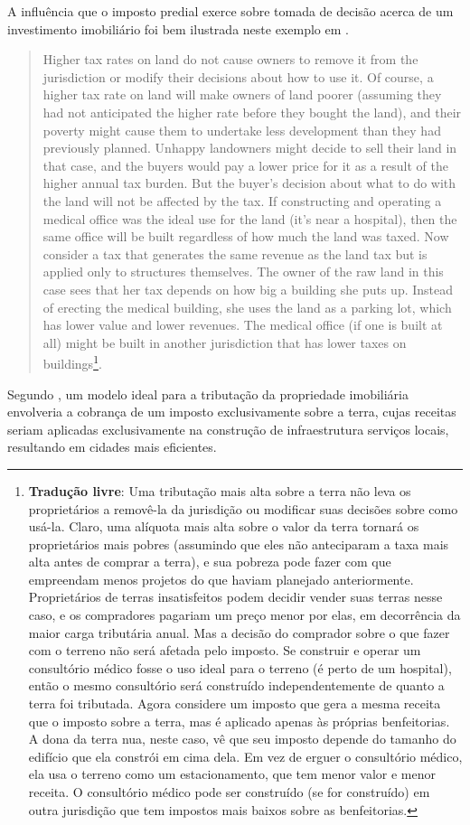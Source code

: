 \documentclass[
	12pt,				%
	oneside,			%
	a4paper,			%
	chapter=TITLE,		%
	section=TITLE,		%
	english,			%
	brazil				%
	]{abntex2}
\begin{document}
\begin{refsection}
A influência que o imposto predial exerce sobre tomada de decisão acerca de um
investimento imobiliário foi bem ilustrada neste exemplo em \textcite[149]{fischel2015}.
\begin{quote}
Higher tax rates on land do not cause owners to remove it from the
jurisdiction or modify their decisions about how to use it. Of course, a higher
tax rate on land will make owners of land poorer (assuming they had not
anticipated the higher rate before they bought the land), and their poverty
might cause them to undertake less development than they had previously planned.
Unhappy landowners might decide to sell their land in that case, and the buyers
would pay a lower price for it as a result of the higher annual tax burden. But
the buyer's decision about what to do with the land will not be affected by the
tax. If constructing and operating a medical office was the ideal use for the
land (it's near a hospital), then the same office will be built regardless of
how much the land was taxed. Now consider a tax that generates the same revenue
as the land tax but is applied only to structures themselves. The owner of the
raw land in this case sees that her tax depends on how big a building she puts
up. Instead of erecting the medical building, she uses the land as a parking
lot, which has lower value and lower revenues. The medical office (if one is
built at all) might be built in another jurisdiction that has lower taxes on
buildings\footnote{\textbf{Tradução livre}: Uma tributação mais alta sobre a terra não leva os
  proprietários a removê-la da jurisdição ou modificar suas decisões sobre como
  usá-la. Claro, uma alíquota mais alta sobre o valor da terra tornará os
  proprietários mais pobres (assumindo que eles não anteciparam a taxa mais alta
  antes de comprar a terra), e sua pobreza pode fazer com que empreendam menos
  projetos do que haviam planejado anteriormente. Proprietários de terras
  insatisfeitos podem decidir vender suas terras nesse caso, e os compradores
  pagariam um preço menor por elas, em decorrência da maior carga tributária
  anual. Mas a decisão do comprador sobre o que fazer com o terreno não será
  afetada pelo imposto. Se construir e operar um consultório médico fosse o uso
  ideal para o terreno (é perto de um hospital), então o mesmo consultório será
  construído independentemente de quanto a terra foi tributada. Agora considere um
  imposto que gera a mesma receita que o imposto sobre a terra, mas é aplicado
  apenas às próprias benfeitorias. A dona da terra nua, neste caso, vê que seu
  imposto depende do tamanho do edifício que ela constrói em cima dela. Em vez de
  erguer o consultório médico, ela usa o terreno como um estacionamento, que tem
  menor valor e menor receita. O consultório médico pode ser construído (se for
  construído) em outra jurisdição que tem impostos mais baixos sobre as
  benfeitorias.}.
\end{quote}
Segundo \textcite{stiglitz1979}, um modelo ideal para a tributação da propriedade
imobiliária envolveria a cobrança de um imposto exclusivamente sobre a
terra, cujas receitas seriam aplicadas exclusivamente na construção de
infraestrutura serviços locais, resultando em cidades mais eficientes.


\end{refsection}
\end{document}
